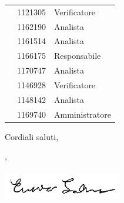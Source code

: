 \documentclass[12pt]{letter}
\begin{document}
\begin{letter}
{\begin{longtable}{ C{4cm} C{3cm} C{6cm} }
                \endhead 
                \MC{} & 1121305 & Verificatore \\
                \LD{} & 1162190 & Analista \\
                \CE{} & 1161514 & Analista \\
                \SE{} & 1166175 & Responsabile \\
                \PF{} & 1170747 & Analista \\
                \DF{} & 1146928 & Verificatore \\
                \BR{} & 1148142 & Analista \\
                \AT{} & 1169740 & Amministratore \\  
            \end{longtable}
        }
        Cordiali saluti,
        \closing{\SE{}, \\ \textit{\Responsabile{}}\\ \includegraphics[width=.6\linewidth]{../DocumentazioneEsterna/PianoDiProgetto/Sezioni/Immagini/Firme/Enrico.png}}
        \vspace{10mm}
    \end{letter}
\end{document}
